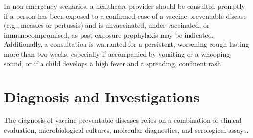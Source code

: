 In non-emergency scenarios, a healthcare provider should be consulted promptly if a person has been exposed to a confirmed case of a vaccine-preventable disease (e.g., measles or pertussis) and is unvaccinated, under-vaccinated, or immunocompromised, as post-exposure prophylaxis may be indicated. Additionally, a consultation is warranted for a persistent, worsening cough lasting more than two weeks, especially if accompanied by vomiting or a whooping sound, or if a child develops a high fever and a spreading, confluent rash.

\section*{Diagnosis and Investigations}
The diagnosis of vaccine-preventable diseases relies on a combination of clinical evaluation, microbiological cultures, molecular diagnostics, and serological assays.
